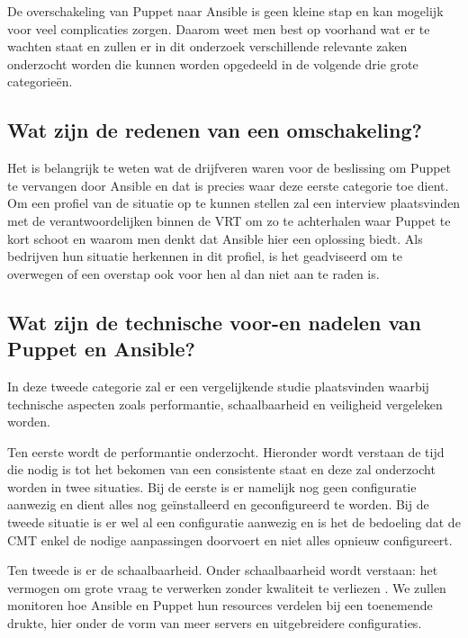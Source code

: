 
De overschakeling van Puppet naar Ansible is geen kleine stap en kan mogelijk voor veel complicaties zorgen. Daarom weet men best op voorhand wat er te wachten staat en zullen er in dit onderzoek verschillende relevante zaken onderzocht worden die kunnen worden opgedeeld in de volgende drie grote categorie\"en. 


\subsection{Wat zijn de redenen van een omschakeling?}

Het is belangrijk te weten wat de drijfveren waren voor de beslissing om Puppet te vervangen door Ansible en dat is precies waar deze eerste categorie toe dient. Om een profiel van de situatie op te kunnen stellen zal een interview plaatsvinden met de verantwoordelijken binnen de VRT om zo te achterhalen waar Puppet te kort schoot en waarom men denkt dat Ansible hier een oplossing biedt. Als bedrijven hun situatie herkennen in dit profiel, is het geadviseerd om te overwegen of een overstap ook voor hen al dan niet aan te raden is.

\subsection{Wat zijn de technische voor-en nadelen van Puppet en Ansible?}

In deze tweede categorie zal er een vergelijkende studie plaatsvinden waarbij technische aspecten zoals performantie, schaalbaarheid en veiligheid vergeleken worden. 
 
 Ten eerste wordt de performantie onderzocht. Hieronder wordt verstaan de tijd die nodig is tot het bekomen van een consistente staat en deze zal onderzocht worden in twee situaties. Bij de eerste is er namelijk nog geen configuratie aanwezig en dient alles nog ge\"installeerd en geconfigureerd te worden. Bij de tweede situatie is er wel al een configuratie aanwezig en is het de bedoeling dat de CMT enkel de nodige aanpassingen doorvoert en niet alles opnieuw configureert. 

Ten tweede is er de schaalbaarheid. Onder schaalbaarheid wordt verstaan: het vermogen om grote vraag te verwerken zonder kwaliteit te verliezen \autocite{informit}. We zullen monitoren hoe Ansible en Puppet hun resources verdelen bij een toenemende drukte, hier onder de vorm van meer servers en uitgebreidere configuraties. 

